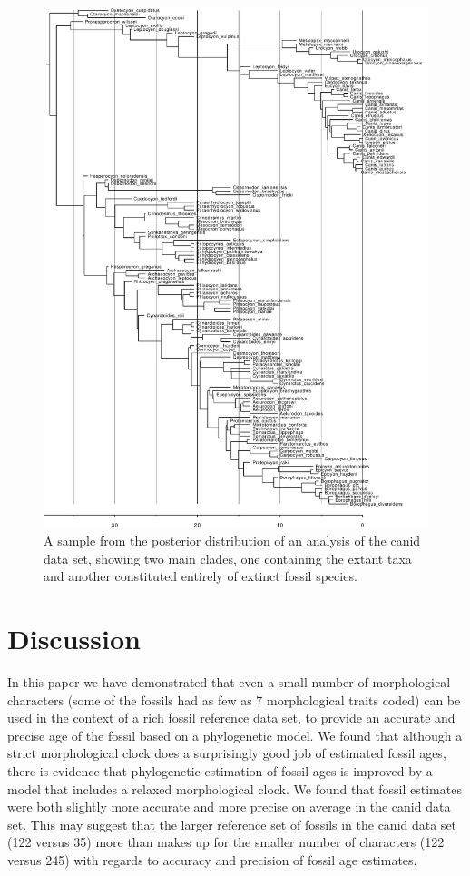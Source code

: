 \documentclass[11pt]{article}
\begin{document}
\begin{figure}
\includegraphics[width=15cm]{canids/1_canids-1440516016976-tree5001.pdf}
\caption{\label{fig:canidTree} A sample from the posterior distribution of an analysis of the canid data set, showing two main clades, one containing the extant taxa and another constituted entirely of extinct fossil species.}
\end{figure}

\section*{Discussion}

In this paper we have demonstrated that even a small number of morphological characters (some of the fossils had as few as 7 morphological traits coded) can be used in the context of a rich fossil reference data set, to provide an accurate and precise age of the fossil based on a phylogenetic model. 
We found that although a strict morphological clock does a surprisingly good job of estimated fossil ages, there is evidence that phylogenetic estimation of fossil ages is improved by a model that includes a relaxed morphological clock. 
We found that fossil estimates were both slightly more accurate and more precise on average in the canid data set. 
This may suggest that the larger reference set of fossils in the canid data set (122 versus 35) more than makes up for the smaller number of characters (122 versus 245) with regards to accuracy and precision of fossil age estimates.
\end{document}
